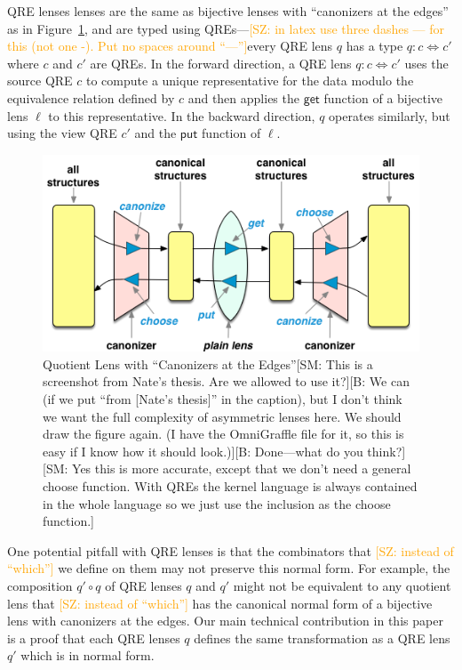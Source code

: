 \documentclass{svproc}
\newcommand{\FINISH}[3]{\ifdraft\textcolor{#1}{[#2: #3]}\fi}
\newcommand{\bcp}[1]{\FINISH{dkred}{B}{#1}}
\newcommand{\saz}[1]{\FINISH{orange}{SZ}{#1}}
\newcommand{\sam}[1]{\FINISH{dkpurple}{SM}{#1}}
\newcommand{\kw}[1]{\ensuremath{\mathsf{#1}}}
\newcommand{\get}{\ensuremath{\kw{get}}}
\newcommand{\lput}{\ensuremath{\kw{put}}}
\begin{document}
QRE lenses lenses are the same as bijective lenses with ``canonizers at the
edges'' as in Figure~\ref{fig:attheedges}, and are typed using QREs---\saz{in
  latex use three dashes --- for this (not one -).  Put no spaces around ``---''}every QRE
lens $q$ has a type $q: c \Leftrightarrow c'$ where $c$ and $c'$ are QREs.
In the forward direction, a QRE lens $q: c \Leftrightarrow c'$ uses the source
QRE $c$ to compute a unique representative for the data modulo the equivalence
relation defined by $c$ and then applies the $\get$ function of a bijective
lens $\ell$ to this representative. In the backward direction, $q$ operates
similarly,  but using the view QRE $c'$ and the $\lput$ function of $\ell$.

\begin{figure}[t]
  \centering
  \includegraphics[width=\textwidth]{canonizers-outside}
  \caption{Quotient Lens with ``Canonizers at the Edges''\sam{This is a
      screenshot from Nate's thesis. Are we allowed to use it?}\bcp{We can
      (if we put ``from [Nate's thesis]'' in the caption), but I don't think
      we want the full complexity of asymmetric lenses here.  We should draw
      the figure again.  (I have the OmniGraffle file for it, so this is
      easy if I know how it should look.)}\bcp{Done---what do you think?}
      \sam{Yes this is more accurate, except that we don't need a general choose
      function. With QREs the kernel language is always contained in the whole
      language so we just use the inclusion as the choose function.}}
  \label{fig:attheedges}
\end{figure}

One potential pitfall with QRE lenses is that the combinators that \saz{instead
  of ``which''}
we define on them may not preserve this normal form. For example, the
composition $q' \circ q$ of QRE lenses $q$ and $q'$ might not be equivalent to
any quotient lens that \saz{instead of ``which''} has the canonical normal form of a bijective lens with
canonizers at the edges. Our main technical contribution in this paper is a
proof that each QRE lenses $q$ defines the same transformation as a QRE lens
$q'$ which is in normal form.
\end{document}
